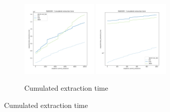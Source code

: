 \begin{figure}

    \centering
    \begin{subfigure}[b]{\textwidth}
        \centering
        \includegraphics[width=0.40\textwidth]{./fragments/05_workhorse_experiment/images/01_basebenchmark_01_random_case.png.0_0.png}
        \includegraphics[width=0.40\textwidth]{./fragments/05_workhorse_experiment/images/01_basebenchmark_01_random_case.png.0_1.png}
        \caption{Cumulated extraction time}
        \label{FIG:WORKHORSE_BENCHMARK_01__0_0}
    \end{subfigure}


\end{figure}

